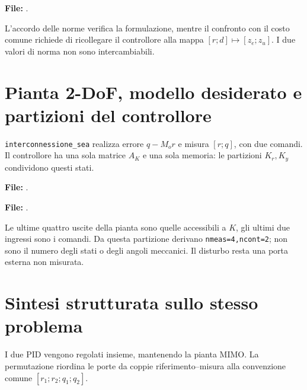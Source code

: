 \par\medskip\noindent\begin{minipage}{\linewidth}
\noindent\textbf{File:} .

\end{minipage}\par\medskip

L'accordo delle norme verifica la formulazione, mentre il confronto
con il costo comune richiede di ricollegare il controllore alla mappa
$[r;d]\mapsto[z_e;z_u]$. I due valori di norma non sono intercambiabili.

\section{Pianta 2-DoF, modello desiderato e partizioni del controllore}
\texttt{interconnessione\_sea} realizza errore $q-M_or$ e misura
$[r;q]$, con due comandi. Il controllore ha una sola matrice $A_K$ e
una sola memoria: le partizioni $K_r,K_y$ condividono questi stati.

\par\medskip\noindent\begin{minipage}{\linewidth}
\noindent\textbf{File:} .

\end{minipage}\par\medskip

\par\medskip\noindent\begin{minipage}{\linewidth}
\noindent\textbf{File:} .

\end{minipage}\par\medskip

Le ultime quattro uscite della pianta sono quelle accessibili a $K$,
gli ultimi due ingressi sono i comandi. Da questa partizione derivano
\texttt{nmeas=4,ncont=2}; non sono il numero degli stati o degli angoli
meccanici. Il disturbo resta una porta esterna non misurata.

\section{Sintesi strutturata sullo stesso problema}
I due PID vengono regolati insieme, mantenendo la pianta MIMO. La
permutazione riordina le porte da coppie riferimento--misura alla
convenzione comune $[r_1;r_2;q_1;q_2]$.


